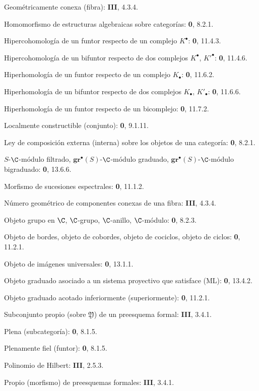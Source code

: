 \documentclass[oneside]{amsart}
\newcommand{\oldpage}[2][]{{\marginnote{\normalfont\textbf{#1}~|~#2}}\ignorespaces}
\begin{document}
\begin{flushleft}
Geométricamente conexa (fibra): \textbf{III}, 4.3.4.

Homomorfismo de estructuras algebraicas sobre categorías: \textbf 0, 8.2.1.

Hipercohomología de un funtor respecto de un complejo $K^\bullet$:
\textbf 0, 11.4.3.

Hipercohomología de un bifuntor respecto de dos complejos
$K^\bullet$, $K'^{\bullet}$: \textbf 0, 11.4.6.

Hiperhomología de un funtor respecto de un complejo $K_\bullet$:
\textbf 0, 11.6.2.

Hiperhomología de un bifuntor respecto de dos complejos $K_\bullet$,
$K'_\bullet$: \textbf 0, 11.6.6.

Hiperhomología de un funtor respecto de un bicomplejo: \textbf 0, 11.7.2.

Localmente constructible (conjunto): \textbf 0, 9.1.11.

Ley de composición externa (interna) sobre los objetos de una categoría: \textbf 0, 8.2.1.

\oldpage[III]{164}

$S$-$\C$-módulo filtrado, $\mathbf{gr}^\bullet(S)$-$\C$-módulo graduado,
$\mathbf{gr}^\bullet(S)$-$\C$-módulo bigraduado: \textbf 0, 13.6.6.

Morfismo de sucesiones espectrales: \textbf 0, 11.1.2.

Número geométrico de componentes conexas de una fibra: \textbf{III}, 4.3.4.

Objeto grupo en $\C$, $\C$-grupo, $\C$-anillo, $\C$-módulo: \textbf 0, 8.2.3.

Objeto de bordes, objeto de cobordes, objeto de cociclos, objeto de
ciclos: \textbf 0, 11.2.1.

Objeto de imágenes universales: \textbf 0, 13.1.1.

Objeto graduado asociado a un sistema proyectivo que satisface (ML): \textbf 0, 13.4.2.

Objeto graduado acotado inferiormente (superiormente): \textbf 0, 11.2.1.

Subconjunto propio (sobre $\mathfrak Y$) de un preesquema formal: \textbf{III}, 3.4.1.

Plena (subcategoría): \textbf 0, 8.1.5.

Plenamente fiel (funtor): \textbf 0, 8.1.5.

Polinomio de Hilbert: \textbf{III}, 2.5.3.

Propio (morfismo) de preesquemas formales: \textbf{III}, 3.4.1.


\end{flushleft}
\end{document}
